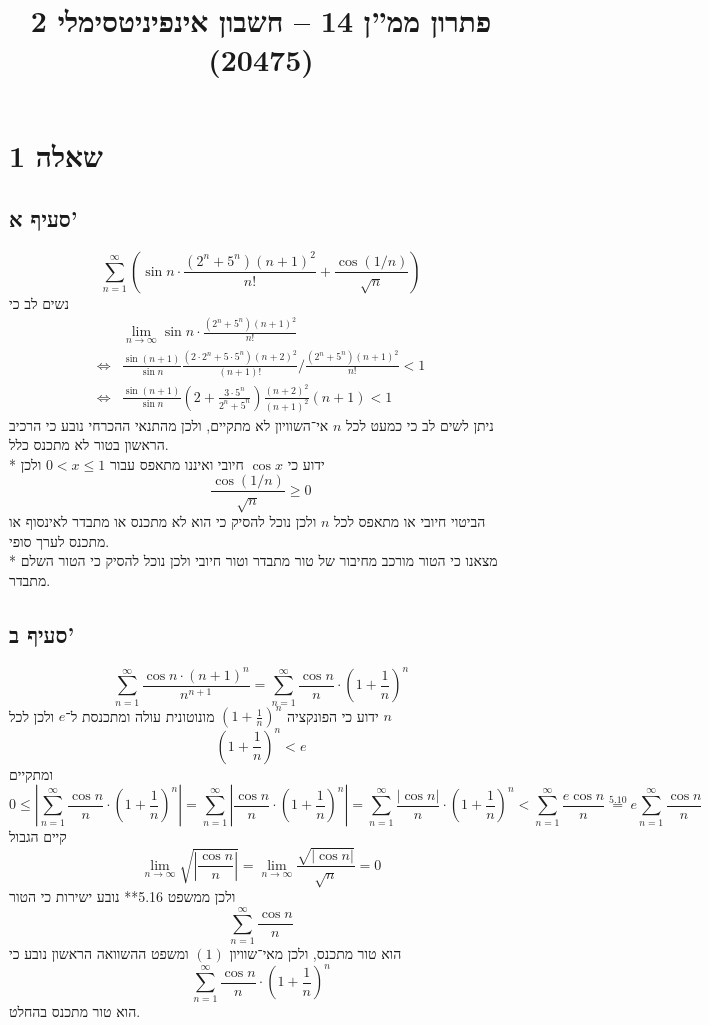 
\title{פתרון ממ''ן 14 – חשבון אינפיניטסימלי 2 (20475)}


\maketitle
\maketitleprint{}

\section{שאלה 1}
\subsection{סעיף א'}
\[
	\sum_{n = 1}^\infty \left( \sin n \cdot \frac{ (2^n + 5^n) {(n + 1)}^2}{n!} + \frac{\cos(1/n)}{\sqrt{n}} \right)
\]
נשים לב כי
\begin{align*}
	& \lim_{n \to \infty} \sin n \cdot \frac{ (2^n + 5^n) {(n + 1)}^2}{n!} \\
	\iff & \frac{\sin(n + 1)}{\sin n} \frac{ (2 \cdot 2^n + 5 \cdot 5^n) {(n + 2)}^2}{(n + 1)!} / \frac{ (2^n + 5^n) {(n + 1)}^2}{n!} < 1 \\
	\iff & \frac{\sin(n + 1)}{\sin n} (2 + \frac{3 \cdot 5^n}{2^n + 5^n}) \frac{{(n + 2)}^2}{{(n + 1)}^2}(n + 1) < 1
\end{align*}
ניתן לשים לב כי כמעט לכל $n$ אי־השוויון לא מתקיים, ולכן מהתנאי ההכרחי נובע כי הרכיב הראשון בטור לא מתכנס כלל. \\*
ידוע כי $\cos x$ חיובי ואיננו מתאפס עבור $0 < x \le 1$ ולכן
\[
	\frac{\cos(1/n)}{\sqrt{n}} \ge 0
\]
הביטוי חיובי או מתאפס לכל $n$ ולכן נוכל להסיק כי הוא לא מתכנס או מתבדר לאינסוף או מתכנס לערך סופי. \\*
מצאנו כי הטור מורכב מחיבור של טור מתבדר וטור חיובי ולכן נוכל להסיק כי הטור השלם מתבדר.

\subsection{סעיף ב'}
\[
	\sum_{n = 1}^{\infty} \frac{\cos n \cdot {(n + 1)}^n}{n^{n + 1}}
	= \sum_{n = 1}^{\infty} \frac{\cos n}{n} \cdot {(1 + \frac{1}{n})}^n
\]
ידוע כי הפונקציה ${(1 + \frac{1}{n})}^n$ מונוטונית עולה ומתכנסת ל־$e$ ולכן לכל $n$
\[
	{(1 + \frac{1}{n})}^n < e
\]
ומתקיים
\[
	0 \le
	\left\lvert \sum_{n = 1}^{\infty} \frac{\cos n}{n} \cdot {(1 + \frac{1}{n})}^n \right\rvert
	= \sum_{n = 1}^{\infty} \left\lvert \frac{\cos n}{n} \cdot {(1 + \frac{1}{n})}^n \right\rvert
	= \sum_{n = 1}^{\infty} \frac{\lvert \cos n \rvert}{n} \cdot {(1 + \frac{1}{n})}^n
	< \sum_{n = 1}^{\infty} \frac{e \cos n}{n}
	\overset{5.10}{=} e \sum_{n = 1}^{\infty} \frac{\cos n}{n}
	\tag{1}
\]
קיים הגבול
\[
	\lim_{n \to \infty} \sqrt{\left\lvert \frac{\cos n}{n} \right\rvert}
	= \lim_{n \to \infty} \frac{\sqrt{\left\lvert \cos n \right\rvert}}{\sqrt{n}} = 0
\]
ולכן ממשפט 5.16** נובע ישירות כי הטור
\[
	\sum_{n = 1}^{\infty} \frac{\cos n}{n}
\]
הוא טור מתכנס, ולכן מאי־שוויון $(1)$ ומשפט ההשוואה הראשון נובע כי
\[
	\sum_{n = 1}^{\infty} \frac{\cos n}{n} \cdot {(1 + \frac{1}{n})}^n
\]
הוא טור מתכנס בהחלט.

